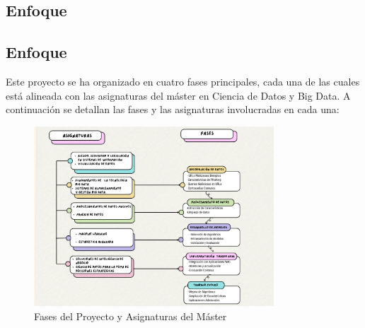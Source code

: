 \subsection{Enfoque}

\subsection{Enfoque}

Este proyecto se ha organizado en cuatro fases principales, cada una de las cuales está alineada con las asignaturas del máster en Ciencia de Datos y Big Data. A continuación se detallan las fases y las asignaturas involucradas en cada una:
\begin{figure}[H]
    \centering
    \includegraphics[width=0.8\textwidth]{imagenn1.png}
    \caption{Fases del Proyecto y Asignaturas del Máster}
\end{figure}
